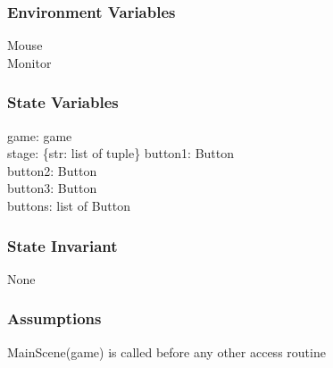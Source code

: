 \documentclass{article}
\begin{document}
\subsubsection {Environment Variables}
Mouse\\
Monitor

\subsubsection {State Variables}
game: game\\
stage: \{str: list of tuple\}
button1: Button\\
button2: Button\\
button3: Button\\
buttons: list of Button
\subsubsection {State Invariant}
None

\subsubsection {Assumptions}
MainScene(game) is called before any other access routine
\end{document}
